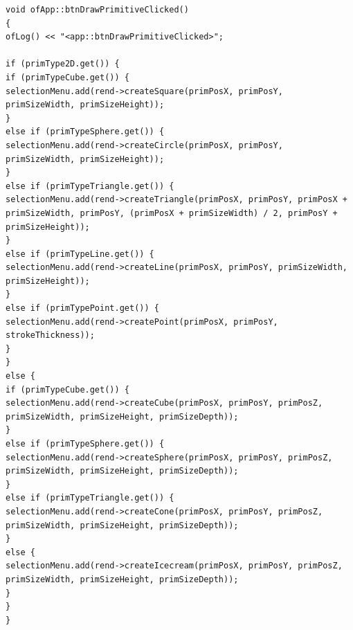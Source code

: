 \newpage

\begin{lstlisting}
void ofApp::btnDrawPrimitiveClicked()
{
ofLog() << "<app::btnDrawPrimitiveClicked>";

if (primType2D.get()) {
if (primTypeCube.get()) {
selectionMenu.add(rend->createSquare(primPosX, primPosY, primSizeWidth, primSizeHeight));
}
else if (primTypeSphere.get()) {
selectionMenu.add(rend->createCircle(primPosX, primPosY, primSizeWidth, primSizeHeight));
}
else if (primTypeTriangle.get()) {
selectionMenu.add(rend->createTriangle(primPosX, primPosY, primPosX + primSizeWidth, primPosY, (primPosX + primSizeWidth) / 2, primPosY + primSizeHeight));
}
else if (primTypeLine.get()) {
selectionMenu.add(rend->createLine(primPosX, primPosY, primSizeWidth, primSizeHeight));
}
else if (primTypePoint.get()) {
selectionMenu.add(rend->createPoint(primPosX, primPosY, strokeThickness));
}
}
else {
if (primTypeCube.get()) {
selectionMenu.add(rend->createCube(primPosX, primPosY, primPosZ, primSizeWidth, primSizeHeight, primSizeDepth));
}
else if (primTypeSphere.get()) {
selectionMenu.add(rend->createSphere(primPosX, primPosY, primPosZ, primSizeWidth, primSizeHeight, primSizeDepth));
}
else if (primTypeTriangle.get()) {
selectionMenu.add(rend->createCone(primPosX, primPosY, primPosZ, primSizeWidth, primSizeHeight, primSizeDepth));
}
else {
selectionMenu.add(rend->createIcecream(primPosX, primPosY, primPosZ, primSizeWidth, primSizeHeight, primSizeDepth));
}
}
}
\end{lstlisting}

\newpage

